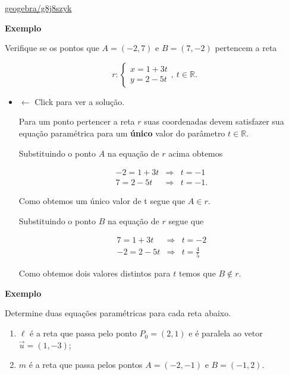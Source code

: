 \documentclass[
  brazilian,
  letterpaper,
  DIV=11,
  numbers=noendperiod]{scrreprt}
\providecommand{\tightlist}{%
  \setlength{\itemsep}{0pt}\setlength{\parskip}{0pt}}
\theoremstyle{definition}
\theoremstyle{plain}
\theoremstyle{definition}
\theoremstyle{remark}
\begin{document}
\url{geogebra/g8j8szyk}

\textbf{Exemplo}

Verifique se os pontos que \(A=(-2,7)\) e \(B=(7,-2)\) pertencem a reta

\[
r: \left\{
\begin{array}{l}
x = 1 + 3t \\
y = 2 - 5t
\end{array}
\right. , \ t \in \mathbb{R}.
\]

\begin{itemize}
\item
  \(\leftarrow\) Click para ver a solução.

  Para um ponto pertencer a reta \(r\) suas coordenadas devem satisfazer
  sua equação paramétrica para um \textbf{único} valor do parâmetro
  \(t \in \mathbb{R}\).

  Substituindo o ponto \(A\) na equação de \(r\) acima obtemos

  \[
    \begin{array}{lcl}
    -2 = 1 + 3t & \Rightarrow &t=-1 \\
    7 = 2 - 5t & \Rightarrow & t=-1.
    \end{array}
    \]

  Como obtemos um único valor de t segue que \(A\in r\).

  Substituindo o ponto \(B\) na equação de \(r\) segue que

  \[
    \begin{array}{lcl}
    7 = 1 + 3t &\Rightarrow & t= -2\\
    -2 = 2 - 5t &\Rightarrow & t=\frac{4}{5}
    \end{array}
    \]

  Como obtemos dois valores distintos para \(t\) temos que
  \(B \notin r\).
\end{itemize}

\textbf{Exemplo}

Determine duas equações paramétricas para cada reta abaixo.

\begin{enumerate}
\def\labelenumi{\arabic{enumi}.}
\tightlist
\item
  \(\ell\) é a reta que passa pelo ponto \(P_0=(2,1)\) e é paralela ao
  vetor \(\vec{u}=(1,-3)\);
\item
  \(m\) é a reta que passa pelos pontos \(A=(-2,-1)\) e \(B=(-1,2).\)
\end{enumerate}
\end{document}
